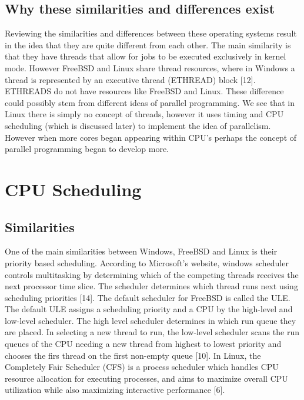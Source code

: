 \documentclass[onecolumn, draftclsnofoot,10pt, compsoc]{IEEEtran}
\begin{document}
\subsection{Why these similarities and differences exist}

Reviewing the similarities and differences between these operating systems result in the idea that they are quite different from each other. The main similarity is that they have threads that allow for jobs to be executed exclusively in kernel mode. However FreeBSD and Linux share thread resources, where in Windows a thread is represented by an executive thread (ETHREAD) block [12]. ETHREADS do not have resources like FreeBSD and Linux. These difference could possibly stem from different ideas of parallel programming. We see that in Linux there is simply no concept of threads, however it uses timing and CPU scheduling (which is discussed later) to implement the idea of parallelism. However when more cores began appearing within CPU's perhaps the concept of parallel programming began to develop more. 

\section{CPU Scheduling}

\subsection{Similarities}

One of the main similarities between Windows, FreeBSD and Linux is their priority based scheduling. According to Microsoft’s website, windows scheduler controls multitasking by determining which of the competing threads receives the next processor time slice. The scheduler determines which thread runs next using scheduling priorities [14]. The default scheduler for FreeBSD is called the ULE. The default ULE assigns a scheduling priority and a CPU by the high-level and low-level scheduler. The high level scheduler determines in which run queue they are placed. In selecting a new thread to run, the low-level scheduler scans the run queues of the CPU needing a new thread from highest to lowest priority and chooses the firs thread on the first non-empty queue [10]. In Linux, the Completely Fair Scheduler (CFS) is a process scheduler which handles CPU resource allocation for executing processes, and aims to maximize overall CPU utilization while also maximizing interactive performance [6].
\end{document}
